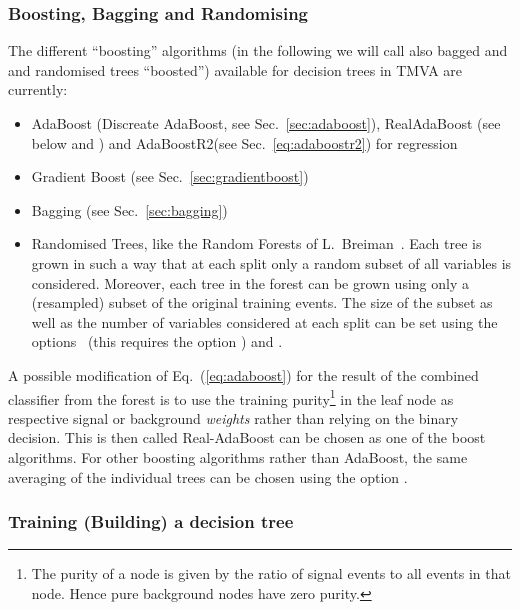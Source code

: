 \subsubsection{Boosting, Bagging and Randomising}

The different ``boosting'' algorithms (in the following we will 
call also bagged and and randomised trees ``boosted'') available
for decision trees in TMVA are currently:
\begin{itemize}
\item AdaBoost (Discreate AdaBoost, see Sec.~\ref{sec:adaboost}),  RealAdaBoost (see below and \cite{RealAdaBoost}) and AdaBoostR2(see Sec.~\ref{eq:adaboostr2}) for regression
\item Gradient Boost (see Sec.~\ref{sec:gradientboost})
\item Bagging (see Sec.~\ref{sec:bagging})
\item Randomised Trees, like the Random Forests of L.~Breiman~\cite{Breiman2001}. 
  Each tree is grown in such a way that at each split only a random
  subset of all variables is considered. Moreover, each tree in the forest
  can be grown using only a (resampled) subset of the original training events.
  The size of the subset as well as the number of variables considered at each
  split can be set using the options~ (this requires
  the option ) and .
\end{itemize}

A possible modification of Eq.~(\ref{eq:adaboost}) for the result of
the combined classifier from the forest is to use the training
purity\footnote { The purity of a node is given by the ratio of signal
  events to all events in that node. Hence pure background nodes have
  zero purity.  }  in the leaf node as respective signal or background
{\em weights} rather than relying on the binary decision. This is then
called Real-AdaBoost can be chosen as one of the boost algorithms. For
other boosting algorithms rather than AdaBoost, the same averaging of
the individual trees can be chosen using the option
 .


\subsubsection*{Training (Building) a decision tree}
\label{sec:treebuilding}


